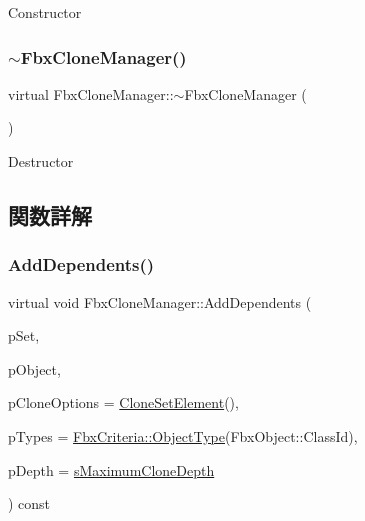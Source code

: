Constructor \mbox{\label{class_fbx_clone_manager_a8e2ff57b1e9d8ed1b8edb4274cf1c369}} 
\subsubsection{\texorpdfstring{$\sim$\+Fbx\+Clone\+Manager()}{~FbxCloneManager()}}
{\footnotesize\ttfamily virtual Fbx\+Clone\+Manager\+::$\sim$\+Fbx\+Clone\+Manager (\begin{DoxyParamCaption}{ }\end{DoxyParamCaption})\hspace{0.3cm}{\ttfamily [virtual]}}

Destructor 

\subsection{関数詳解}
\mbox{\label{class_fbx_clone_manager_a3a7786f536d8f61f0b84f114e6e870d2}} 
\subsubsection{\texorpdfstring{Add\+Dependents()}{AddDependents()}}
{\footnotesize\ttfamily virtual void Fbx\+Clone\+Manager\+::\+Add\+Dependents (\begin{DoxyParamCaption}\item[{\hyperlink{class_fbx_clone_manager_aeb8a9c04c9c36eb7e551186a0b18f10d}{Clone\+Set} \&}]{p\+Set,  }\item[{const \hyperlink{class_fbx_object}{Fbx\+Object} $\ast$}]{p\+Object,  }\item[{const \hyperlink{struct_fbx_clone_manager_1_1_clone_set_element}{Clone\+Set\+Element} \&}]{p\+Clone\+Options = {\ttfamily \hyperlink{struct_fbx_clone_manager_1_1_clone_set_element}{Clone\+Set\+Element}()},  }\item[{\hyperlink{class_fbx_criteria}{Fbx\+Criteria}}]{p\+Types = {\ttfamily \hyperlink{class_fbx_criteria_a760d66022a8febcd3fd0c5fbbb534023}{Fbx\+Criteria\+::\+Object\+Type}(FbxObject\+:\+:ClassId)},  }\item[{int}]{p\+Depth = {\ttfamily \hyperlink{class_fbx_clone_manager_a1844e81f1b96760b4223024b4c133da7}{s\+Maximum\+Clone\+Depth}} }\end{DoxyParamCaption}) const\hspace{0.3cm}{\ttfamily [virtual]}}

